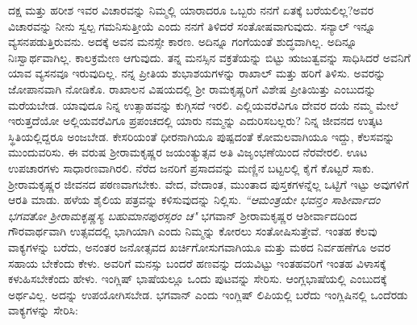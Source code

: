 ದಕ್ಷ ಮತ್ತು ಹರೀಶ ಇವರ ವಿಚಾರವನ್ನು ನಿಮ್ಮಲ್ಲಿ ಯಾರಾದರೂ ಒಬ್ಬರು ನನಗೆ ಏತಕ್ಕೆ ಬರೆಯಲಿಲ್ಲ?ಅವರ ವಿಚಾರವನ್ನು ನೀನು ಸ್ವಲ್ಪ ಗಮನಿಸುತ್ತೀಯೆ ಎಂದು ನನಗೆ ತಿಳಿದರೆ ಸಂತೋಷವಾಗುವುದು. ಸನ್ಯಾಲ್ ಇನ್ನೂ ವ್ಯಸನಪಡುತ್ತಿರುವನು. ಅದಕ್ಕೆ ಅವನ ಮನಸ್ಸೇ ಕಾರಣ. ಅದಿನ್ನೂ ಗಂಗೆಯಂತೆ ಶುದ್ಧವಾಗಿಲ್ಲ. ಅದಿನ್ನೂ ನಿಃಸ್ವಾರ್ಥವಾಗಿಲ್ಲ. ಕಾಲಕ್ರಮೇಣ ಆಗುವುದು. ತನ್ನ ಮನಸ್ಸಿನ ವಕ್ರತೆಯನ್ನು ಬಿಟ್ಟು ಋಜುತ್ವವನ್ನು ಸಾಧಿಸಿದರೆ ಅವನಿಗೆ ಯಾವ ವ್ಯಸನವೂ ಇರುವುದಿಲ್ಲ. ನನ್ನ ಪ್ರೀತಿಯ ಶುಭಾಶಯಗಳನ್ನು ರಾಖಾಲ್ ಮತ್ತು ಹರಿಗೆ ತಿಳಿಸು. ಅವರನ್ನು ಜೋಪಾನವಾಗಿ ನೋಡಿಕೊ. ರಾಖಾಲನ ವಿಷಯದಲ್ಲಿ ಶ‍್ರೀ ರಾಮಕೃಷ್ಣರಿಗೆ ವಿಶೇಷ ಪ್ರೀತಿಯಿತ್ತು ಎಂಬುದನ್ನು ಮರೆಯಬೇಡ. ಯಾವುದೂ ನಿನ್ನ ಉತ್ಸಾಹವನ್ನು ಕುಗ್ಗಿಸದೆ ಇರಲಿ. ಎಲ್ಲಿಯವರೆವಿಗೂ ದೇವರ ದಯೆ ನಮ್ಮ ಮೇಲೆ ಇರುತ್ತದೆಯೋ ಅಲ್ಲಿಯವರೆವಿಗೂ ಪ್ರಪಂಚದಲ್ಲಿ ಯಾರು ನಮ್ಮನ್ನು ಎದುರಿಸಬಲ್ಲರು? ನಿನ್ನ ಜೀವನದ ಉತ್ಕಟ ಸ್ಥಿತಿಯಲ್ಲಿದ್ದರೂ ಅಂಜಬೇಡ. ಕೇಸರಿಯಂತೆ ಧೀರನಾಗಿಯೂ ಪುಷ್ಪದಂತೆ ಕೋಮಲವಾಗಿಯೂ ಇದ್ದು, ಕೆಲಸವನ್ನು ಮುಂದುವರಿಸು. ಈ ವರುಷ ಶ‍್ರೀರಾಮಕೃಷ್ಣರ ಜಯಂತ್ಯುತ್ಸವ ಅತಿ ವಿಜೃಂಭಣೆಯಿಂದ ನೆರವೇರಲಿ. ಊಟ ಉಪಚಾರಗಳು ಸಾಧಾರಣವಾಗಿರಲಿ. ನೆರೆದ ಜನರಿಗೆ ಪ್ರಸಾದವನ್ನು ಮಣ್ಣಿನ ಬಟ್ಟಲಲ್ಲಿ ಕೈಗೆ ಕೊಟ್ಟರೆ ಸಾಕು. ಶ‍್ರೀರಾಮಕೃಷ್ಣರ ಜೀವನದ ಪಠಣವಾಗಬೇಕು. ವೇದ, ವೇದಾಂತ, ಮುಂತಾದ ಪುಸ್ತಕಗಳನ್ನೆಲ್ಲ ಒಟ್ಟಿಗೆ ಇಟ್ಟು ಅವುಗಳಿಗೆ ಆರತಿ ಮಾಡು. ಹಳೆಯ ಶೈಲಿಯ ಪತ್ರವನ್ನು ಕಳಿಸುವುದನ್ನು ನಿಲ್ಲಿಸು. \textit{ “ಆಮಂತ್ರಯೇ ಭವನ್ತಂ ಸಾಶೀರ್ವಾದಂ ಭಗವತೋ ಶ‍್ರೀರಾಮಕೃಷ್ಣಸ್ಯ ಬಹುಮಾನಪುರಸ್ಸರಂ ಚ"}\enginline{-} ಭಗವಾನ್ ಶ‍್ರೀರಾಮಕೃಷ್ಣರ ಆಶೀರ್ವಾದದಿಂದ ಗೌರವಾರ್ಥವಾಗಿ ಉತ್ಸವದಲ್ಲಿ ಭಾಗಿಯಾಗಿ ಎಂದು ನಿಮ್ಮನ್ನು ಕೋರಲು ಸಂತೋಷಿಸುತ್ತೇವೆ. ಇಂತಹ ಕೆಲವು ವಾಕ್ಯಗಳನ್ನು ಬರೆದು, ಅನಂತರ ಜನೋತ್ಸವದ ಖರ್ಚಿಗೋಸುಗವಾಗಿಯೂ ಮತ್ತು ಮಠದ ನಿರ್ವಹಣೆಗೂ ಅವರ ಸಹಾಯ ಬೇಕೆಂದು ಕೇಳು. ಅವರಿಗೆ ಮನಸ್ಸು ಬಂದರೆ ಹಣವನ್ನು ದಯವಿಟ್ಟು ಇಂತಹವರಿಗೆ ಇಂತಹ ವಿಳಾಸಕ್ಕೆ ಕಳುಹಿಸಬೇಕೆಂದು ಹೇಳು. ಇಂಗ್ಲಿಷ್ ಭಾಷೆಯಲ್ಲೂ ಒಂದು ಪುಟವನ್ನು ಸೇರಿಸು. ಆಂಗ್ಲಭಾಷೆಯಲ್ಲಿ  ಎಂಬುದಕ್ಕೆ ಅರ್ಥವಿಲ್ಲ. ಅದನ್ನು ಉಪಯೋಗಿಸಬೇಡ. ಭಗವಾನ್ ಎಂದು ಇಂಗ್ಲಿಷ್ ಲಿಪಿಯಲ್ಲಿ ಬರೆದು ಇಂಗ್ಲಿಷಿನಲ್ಲಿ ಒಂದೆರಡು ವಾಕ್ಯಗಳನ್ನು ಸೇರಿಸಿ:


\noindent
{}


\vspace{-0.4cm}

\begin{flushright}
\end{flushright}

